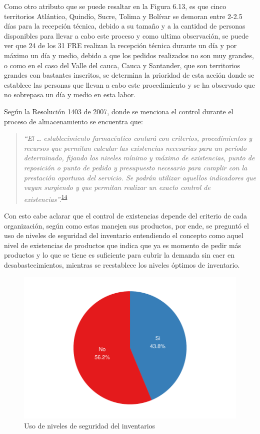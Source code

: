 \documentclass[
]{book}
\begin{document}
Como otro atributo que se puede resaltar en la Figura 6.13, es que cinco territorios Atlántico, Quindío, Sucre, Tolima y Bolívar se demoran entre 2-2.5 días para la recepción técnica, debido a su tamaño y a la cantidad de personas disponibles para llevar a cabo este proceso y como ultima observación, se puede ver que 24 de los 31 FRE realizan la recepción técnica durante un día y por máximo un día y medio, debido a que los pedidos realizados no son muy grandes, o como en el caso del Valle del cauca, Cauca y Santander, que son territorios grandes con bastantes inscritos, se determina la prioridad de esta acción donde se establece las personas que llevan a cabo este procedimiento y se ha observado que no sobrepasa un día y medio en esta labor.

Según la Resolución 1403 de 2007, donde se menciona el control durante el proceso de almacenamiento se encuentra que:

\begin{quote}
\emph{``El \ldots{} establecimiento farmacéutico contará con criterios, procedimientos y recursos que permitan calcular las existencias necesarias para un período determinado, fijando los niveles mínimo y máximo de existencias, punto de reposición o punto de pedido y presupuesto necesario para cumplir con la prestación oportuna del servicio. Se podrán utilizar aquellos indicadores que vayan surgiendo y que permitan realizar un exacto control de existencias''.}\textsuperscript{\protect\hyperlink{ref-MinisteriodeSaludyProteccionSocial2007}{14}}
\end{quote}

Con esto cabe aclarar que el control de existencias depende del criterio de cada organización, según como estas manejen sus productos, por ende, se preguntó el uso de niveles de seguridad del inventario entendiendo el concepto como aquel nivel de existencias de productos que indica que ya es momento de pedir más productos y lo que se tiene es suficiente para cubrir la demanda sin caer en desabastecimientos, mientras se reestablece los niveles óptimos de inventario.

\begin{figure}
\includegraphics[width=0.85\linewidth]{InformeFinal_files/figure-latex/UsoNivelesSeguridad-1} \caption{Uso de niveles de seguridad del inventarios}\label{fig:UsoNivelesSeguridad}
\end{figure}
\end{document}
